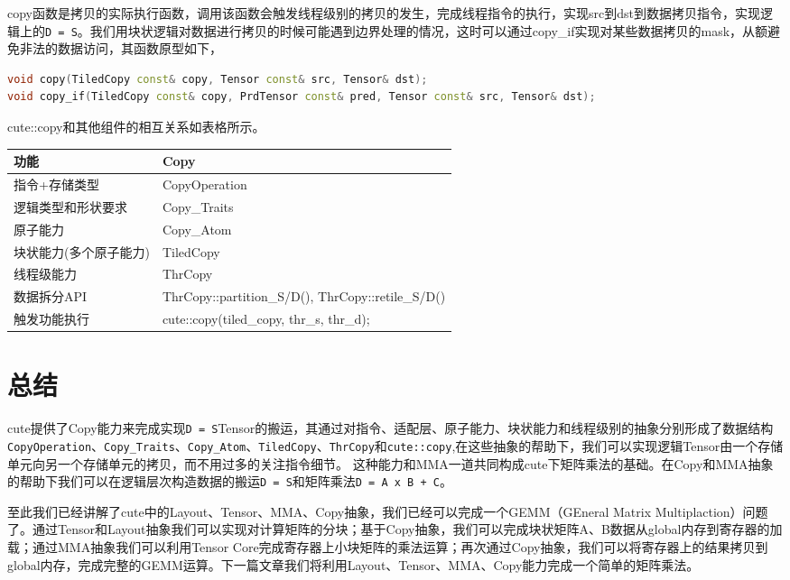 copy函数是拷贝的实际执行函数，调用该函数会触发线程级别的拷贝的发生，完成线程指令的执行，实现src到dst到数据拷贝指令，实现逻辑上的\verb|D = S|。我们用块状逻辑对数据进行拷贝的时候可能遇到边界处理的情况，这时可以通过copy\_if实现对某些数据拷贝的mask，从额避免非法的数据访问，其函数原型如下，

\begin{lstlisting}[language=C++]
void copy(TiledCopy const& copy, Tensor const& src, Tensor& dst);
void copy_if(TiledCopy const& copy, PrdTensor const& pred, Tensor const& src, Tensor& dst);
\end{lstlisting}

cute::copy和其他组件的相互关系如表格所示。

\begin{center}
\begin{tabular}{ll}
\toprule
功能 & Copy \\
\midrule
指令+存储类型 & CopyOperation \\
逻辑类型和形状要求 & Copy\_Traits \\
原子能力 & Copy\_Atom \\
块状能力(多个原子能力) & TiledCopy \\
线程级能力 & ThrCopy \\
数据拆分API & ThrCopy::partition\_S/D(), ThrCopy::retile\_S/D() \\
触发功能执行 & cute::copy(tiled\_copy, thr\_s, thr\_d); \\
\bottomrule
\end{tabular}
\end{center}

\section{总结}

cute提供了Copy能力来完成实现\verb|D = S|Tensor的搬运，其通过对指令、适配层、原子能力、块状能力和线程级别的抽象分别形成了数据结构\verb|CopyOperation|、\verb|Copy_Traits|、\verb|Copy_Atom|、\verb|TiledCopy|、\verb|ThrCopy|和\verb|cute::copy|,在这些抽象的帮助下，我们可以实现逻辑Tensor由一个存储单元向另一个存储单元的拷贝，而不用过多的关注指令细节。 这种能力和MMA一道共同构成cute下矩阵乘法的基础。在Copy和MMA抽象的帮助下我们可以在逻辑层次构造数据的搬运\verb|D = S|和矩阵乘法\verb|D = A x B + C|。

至此我们已经讲解了cute中的Layout、Tensor、MMA、Copy抽象，我们已经可以完成一个GEMM（GEneral Matrix Multiplaction）问题了。通过Tensor和Layout抽象我们可以实现对计算矩阵的分块；基于Copy抽象，我们可以完成块状矩阵A、B数据从global内存到寄存器的加载；通过MMA抽象我们可以利用Tensor Core完成寄存器上小块矩阵的乘法运算；再次通过Copy抽象，我们可以将寄存器上的结果拷贝到global内存，完成完整的GEMM运算。下一篇文章我们将利用Layout、Tensor、MMA、Copy能力完成一个简单的矩阵乘法。

